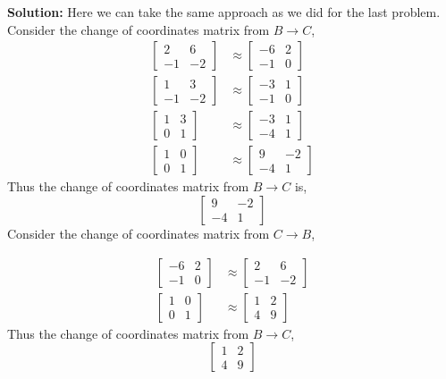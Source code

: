 \documentclass{amsart}
\begin{document}
\noindent \textbf{Solution: } Here we can take the same approach as we did for the last problem. Consider the change of coordinates matrix from $B \to C$,
\begin{align}
 \begin{bmatrix}
 2&6\\
 -1&-2
 \end{bmatrix}
&\approx 
  \begin{bmatrix}
 -6&2\\
 -1&0
 \end{bmatrix}\\
 \begin{bmatrix}
 1&3\\
 -1&-2
 \end{bmatrix}
&\approx 
  \begin{bmatrix}
 -3&1\\
 -1&0
 \end{bmatrix}\\
 \begin{bmatrix}
 1&3\\
 0&1
 \end{bmatrix}
&\approx 
  \begin{bmatrix}
 -3&1\\
 -4&1
 \end{bmatrix}\\
 \begin{bmatrix}
 1&0\\
 0&1
 \end{bmatrix}
&\approx 
  \begin{bmatrix}
 9&-2\\
 -4&1
 \end{bmatrix}
 \end{align}
Thus the  change of coordinates matrix from $B \to C$ is,
\begin{equation*}
  \begin{bmatrix}
 9&-2\\
 -4&1
 \end{bmatrix}
\end{equation*}
Consider the change of coordinates matrix from $C \to B$,

\begin{align}
 \begin{bmatrix}
 -6&2\\
 -1&0
 \end{bmatrix}
&\approx 
 \begin{bmatrix}
 2&6\\
 -1&-2
 \end{bmatrix}\\
  \begin{bmatrix}
 1&0\\
 0&1
 \end{bmatrix}
&\approx 
 \begin{bmatrix}
 1&2\\
 4&9
 \end{bmatrix}
 \end{align}
 Thus the change of coordinates matrix from $B \to C$,
 \begin{equation*}
 \begin{bmatrix}
 1&2\\
 4&9
 \end{bmatrix}
\end{equation*}
\end{document}

